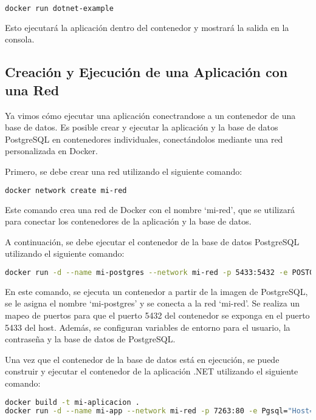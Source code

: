 \documentclass{article}
\begin{document}
\begin{lstlisting}[language=bash]
docker run dotnet-example
\end{lstlisting}

Esto ejecutará la aplicación dentro del contenedor y mostrará la salida en la consola.

\subsection{Creación y Ejecución de una Aplicación con una Red}

Ya vimos cómo ejecutar una aplicación conectrandose a un contenedor de una base de datos. Es posible crear y ejecutar la aplicación y la base de datos PostgreSQL en contenedores individuales, conectándolos mediante una red personalizada en Docker.

Primero, se debe crear una red utilizando el siguiente comando:

\begin{lstlisting}[language=bash]
docker network create mi-red
\end{lstlisting}

Este comando crea una red de Docker con el nombre \enquote*{mi-red}, que se utilizará para conectar los contenedores de la aplicación y la base de datos.

A continuación, se debe ejecutar el contenedor de la base de datos PostgreSQL utilizando el siguiente comando:

\begin{lstlisting}[language=bash]
docker run -d --name mi-postgres --network mi-red -p 5433:5432 -e POSTGRES_USER=postgres -e POSTGRES_PASSWORD=password -e POSTGRES_DB=Curso postgres
\end{lstlisting}

En este comando, se ejecuta un contenedor a partir de la imagen de PostgreSQL, se le asigna el nombre \enquote*{mi-postgres} y se conecta a la red \enquote*{mi-red}. Se realiza un mapeo de puertos para que el puerto 5432 del contenedor se exponga en el puerto 5433 del host. Además, se configuran variables de entorno para el usuario, la contraseña y la base de datos de PostgreSQL.

Una vez que el contenedor de la base de datos está en ejecución, se puede construir y ejecutar el contenedor de la aplicación .NET utilizando el siguiente comando:

\begin{lstlisting}[language=bash]
docker build -t mi-aplicacion .
docker run -d --name mi-app --network mi-red -p 7263:80 -e Pgsql="Host=mi-postgres;Port=5432;Database=Curso;User Id=postgres;Password=password;" mi-aplicacion
\end{lstlisting}
\end{document}
